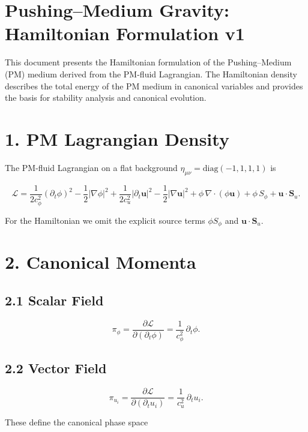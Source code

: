 \documentclass{article}
\begin{document}
\section*{Pushing--Medium Gravity: Hamiltonian Formulation v1}

This document presents the Hamiltonian formulation of the Pushing--Medium (PM)
medium derived from the PM-fluid Lagrangian. The Hamiltonian density describes
the total energy of the PM medium in canonical variables and provides the basis
for stability analysis and canonical evolution.

\section*{1. PM Lagrangian Density}

The PM-fluid Lagrangian on a flat background $\eta_{\mu\nu} =
\mathrm{diag}(-1,1,1,1)$ is


\[
\mathcal{L}
=
\frac{1}{2c_\phi^2}(\partial_t \phi)^2
- \frac{1}{2}|\nabla \phi|^2
+
\frac{1}{2c_u^2}|\partial_t \mathbf u|^2
- \frac{1}{2}|\nabla \mathbf u|^2
+
\phi\,\nabla\cdot(\phi\mathbf u)
+
\phi\,S_\phi
+
\mathbf u\cdot\mathbf S_u.
\]



For the Hamiltonian we omit the explicit source terms
$\phi S_\phi$ and $\mathbf u\cdot\mathbf S_u$.

\section*{2. Canonical Momenta}

\subsection*{2.1 Scalar Field}



\[
\pi_\phi
=
\frac{\partial \mathcal{L}}{\partial(\partial_t \phi)}
=
\frac{1}{c_\phi^2}\,\partial_t \phi.
\]



\subsection*{2.2 Vector Field}



\[
\pi_{u_i}
=
\frac{\partial \mathcal{L}}{\partial(\partial_t u_i)}
=
\frac{1}{c_u^2}\,\partial_t u_i.
\]



These define the canonical phase space
\end{document}
